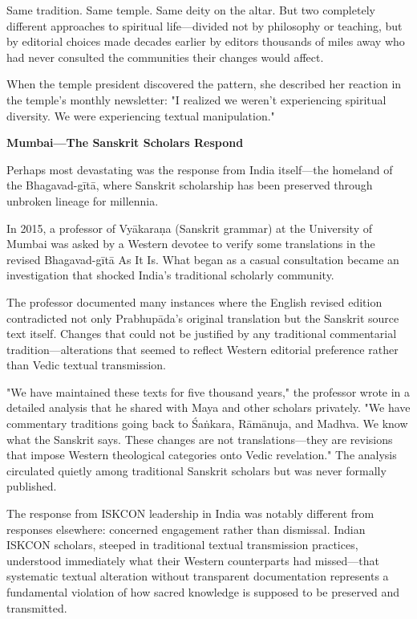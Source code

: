 \documentclass[12pt,twoside]{book}
\begin{document}
Same tradition. Same temple. Same deity on the altar. But two completely different approaches to spiritual life—divided not by philosophy or teaching, but by editorial choices made decades earlier by editors thousands of miles away who had never consulted the communities their changes would affect.

When the temple president discovered the pattern, she described her reaction in the temple's monthly newsletter: "I realized we weren't experiencing spiritual diversity. We were experiencing textual manipulation."

\textbf{\textbf{Mumbai—The Sanskrit Scholars Respond}}

Perhaps most devastating was the response from India itself—the homeland of the Bhagavad-gītā, where Sanskrit scholarship has been preserved through unbroken lineage for millennia.

In 2015, a professor of Vyākaraṇa (Sanskrit grammar) at the University of Mumbai was asked by a Western devotee to verify some translations in the revised Bhagavad-gītā As It Is. What began as a casual consultation became an investigation that shocked India's traditional scholarly community.

The professor documented many instances where the English revised edition contradicted not only Prabhupāda's original translation but the Sanskrit source text itself. Changes that could not be justified by any traditional commentarial tradition—alterations that seemed to reflect Western editorial preference rather than Vedic textual transmission.

"We have maintained these texts for five thousand years," the professor wrote in a detailed analysis that he shared with Maya and other scholars privately. "We have commentary traditions going back to Śaṅkara, Rāmānuja, and Madhva. We know what the Sanskrit says. These changes are not translations—they are revisions that impose Western theological categories onto Vedic revelation." The analysis circulated quietly among traditional Sanskrit scholars but was never formally published.

The response from ISKCON leadership in India was notably different from responses elsewhere: concerned engagement rather than dismissal. Indian ISKCON scholars, steeped in traditional textual transmission practices, understood immediately what their Western counterparts had missed—that systematic textual alteration without transparent documentation represents a fundamental violation of how sacred knowledge is supposed to be preserved and transmitted.
\end{document}
